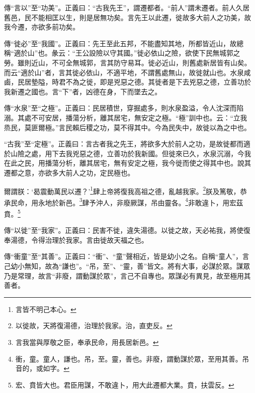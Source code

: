 {\noindent\zhuan{}\fzbyks 傳“言以”至“功美”。正義曰：“古我先王”，謂遷都者。“前人”謂未遷者。前人久居舊邑，民不能相匡以生，則是居無功矣。言先王以此遷，徙故多大前人之功美，故我今遷，亦欲多前功矣。 \par}

{\noindent\zhuan{}\fzbyks 傳“徙必”至“我國”。正義曰：先王至此五邦，不能盡知其地，所都皆近山，故總稱“適於山”也。彖云：“王公設險以守其國。”徙必依山之險，欲使下民無城郭之勞。雖則近山，不可全無城郭，言其防守易耳。徙必近山，則舊處新居皆有山矣。而云“適於山”者，言其徙必依山，不適平地，不謂舊處無山，故徙就山也。水泉咸鹵，民居墊隘，時君不為之徙，即是兇惡之德。其徙者是下去兇惡之德，立善功於我新遷之國也。言“下”者，凶德在身，下而墜去之。 \par}

{\noindent\zhuan{}\fzbyks 傳“水泉”至“之極”。正義曰：民居積世，穿掘處多，則水泉盈溢，令人沈深而陷溺。其處不可安居，播蕩分析，離其居宅，無安定之極。“極”訓中也。云：“立我烝民，莫匪爾極。”言民賴后稷之功，莫不得其中。今為民失中，故徙以為之中也。 \par}

{\noindent\shu{}\fzkt “古我”至“定極”。正義曰：言古者我之先王，將欲多大於前人之功，是故徙都而適於山險之處，用下去我兇惡之德，立善功於我新國。但徙來已久，水泉沉溺，今我在此之民，用播蕩分析，離其居宅，無有安定之極，我今徙而使之得其中也。說其遷都之意，亦欲多大前人之功，定民極也。 \par}

爾謂朕：‘曷震動萬民以遷？’\footnote{言皆不明己本心。}肆上帝將復我高祖之德，亂越我家。\footnote{以徙故，天將復湯德，治理於我家。治，直吏反。}朕及篤敬，恭承民命，用永地於新邑。\footnote{言我當與厚敬之臣，奉承民命，用長居新邑。}肆予沖人，非廢厥謀，吊由靈各。\footnote{衝，童。童人，謙也。吊，至。靈，善也。非廢，謂動謀於眾，至用其善。吊音的，或如字。}非敢違卜，用宏茲賁。\footnote{宏、賁皆大也。君臣用謀，不敢違卜，用大此遷都大業。賁，扶雲反。}

{\noindent\zhuan{}\fzbyks 傳“以徙”至“我家”。正義曰：民害不徙，違失湯德。以徙之故，天必祐我，將使復奉湯德，令得治理於我家。言由徙故天福之也。 \par}

{\noindent\zhuan{}\fzbyks 傳“衝童”至“其善”。正義曰：“衝”、“童”聲相近，皆是幼小之名。自稱“童人”，言己幼小無知，故為“謙也”。“吊，至”、“靈，善”皆文。將有大事，必謀於眾。謀眾乃是常理，故言“非廢，謂動謀於眾”，言己不自專也。眾謀必有異見，故至極用其善者。 \par}


